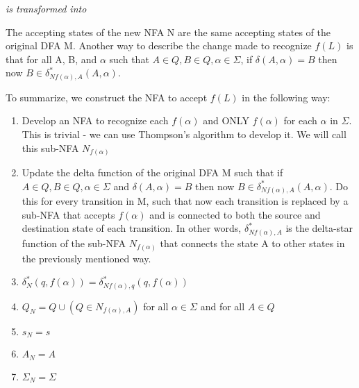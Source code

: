 \documentclass[11pt, letterpaper]{article}
\begin{document}
\bigbreak
\begin{center}

\bigbreak
\textit{is transformed into}
\bigbreak


\end{center}

\quad The accepting states of the new NFA N are the same accepting states of the original DFA M. Another way to describe the change made to recognize $f(L)$ is that for all A, B, and $\alpha$ such that $A \in Q, B \in Q, \alpha \in \Sigma$, if $ \delta(A, \alpha) = B$ then now $B \in \delta_{Nf(\alpha), A}^*(A, \alpha)$. 

To summarize, we construct the NFA to accept $f(L)$ in the following way:

\begin{enumerate}
\item Develop an NFA to recognize each $f(\alpha)$ and ONLY $f(\alpha)$ for each $\alpha$ in $\Sigma$. This is trivial - we can use Thompson's algorithm to develop it. We will call this sub-NFA $N_{f(\alpha)}$
\item Update the delta function of the original DFA M such that if $A \in Q, B\in Q, \alpha \in \Sigma$ and $\delta(A, \alpha) = B$ then now $B \in \delta_{Nf(\alpha), A}^*(A, \alpha)$. Do this for every transition in M, such that now each transition is replaced by a sub-NFA that accepts $f(\alpha)$ and is connected to both the source and destination state of each transition. In other words, $\delta_{Nf(\alpha), A}^*$ is the delta-star function of the sub-NFA $N_{f(\alpha)}$ that connects the state A to other states in the previously mentioned way.
\item $\delta_N^*(q, f(\alpha)) = \delta_{Nf(\alpha), q}^*(q, f(\alpha))$
\item $Q_N = Q \cup (Q \in N_{f(\alpha), A})$ for all $ \alpha \in \Sigma $ and for all $A \in Q$
\item $s_N = s$
\item $A_N = A$
\item $\Sigma_N = \Sigma$
\end{enumerate}
\end{document}
